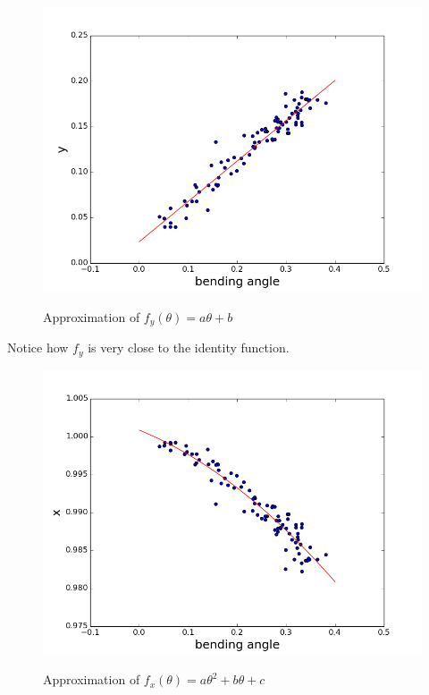 \documentclass[11pt]{report}
\begin{document}
\begin{figure}[H]
    \begin{center}
        \includegraphics[scale=0.5]{images/model-linear-y.png}
        \label{fig:newmodelY}
        \caption{Approximation of $f_y(\theta) = a\theta+b$}
    \end{center}
\end{figure}

Notice how $f_y$ is very close to the identity function.

\begin{figure}[H]
    \begin{center}
        \includegraphics[scale=0.5]{images/model-quadratic-x.png}
        \label{fig:newmodelX}
        \caption{Approximation of $f_x(\theta) = a\theta^2 + b\theta + c$}
    \end{center}
\end{figure}
\end{document}
